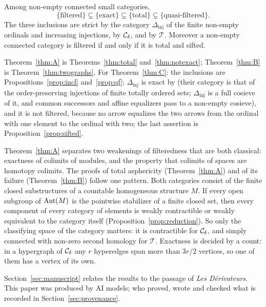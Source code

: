 \begin{theorem}\label{thm:C}
Among non-empty connected small categories,
\[
 \{\text{filtered}\}\subsetneq\{\text{exact}\}\subsetneq\{\text{total}\}
 \subsetneq\{\text{quasi-filtered}\}.
\]
The three inclusions are strict by the category $\Delta_{\mathrm{inj}}$ of
the finite non-empty ordinals and increasing injections, by $\mathcal{C}_{\delta}$, and by
$\mathcal T$. Moreover a non-empty connected category is filtered if and
only if it is total and sifted.
\end{theorem}

Theorem~\ref{thm:A} is Theorems~\ref{thm:total} and~\ref{thm:notexact};
Theorem~\ref{thm:B} is Theorem~\ref{thm:twographs}. For
Theorem~\ref{thm:C}: the inclusions are Propositions~\ref{prop:incl}
and~\ref{prop:qf}; $\Delta_{\mathrm{inj}}$ is exact by
\cite[Theorems~1 and~3]{IM73} (their category is that of the order-preserving
injections of finite totally ordered sets; $\Delta_{\mathrm{inj}}$ is a full
cosieve of it, and common successors and affine equalizers pass to a
non-empty cosieve), and it is not filtered, because no arrow
equalizes the two arrows from the ordinal with one element to the ordinal
with two; the last assertion is Proposition~\ref{prop:sifted}.

Theorem~\ref{thm:A} separates two weakenings of filteredness that are both
classical: exactness of colimits of modules, and the property that colimits of
spaces are homotopy colimits. The proofs of total asphericity
(Theorem~\ref{thm:A}) and of its failure (Theorem~\ref{thm:B}) follow one
pattern. Both categories consist of the finite closed substructures of a
countable homogeneous structure $M$. If every open subgroup of $\operatorname{Aut}(M)$ is
the pointwise stabilizer of a finite closed set, then every component of
every category of elements is weakly contractible or weakly equivalent to
the category itself (Proposition~\ref{prop:reduction}). So only the
classifying space of the category matters: it is contractible for $\mathcal{C}_{\delta}$, and
simply connected with non-zero second homology for $\mathcal T$. Exactness is
decided by a count: in a hypergraph of $\mathcal{C}_{\delta}$ any $r$ hyperedges span more
than $3r/2$ vertices, so one of them has a vertex of its own.

Section~\ref{sec:manuscript} relates the results to the passage of
\emph{Les D\'erivateurs}. This paper was produced by AI models; who proved,
wrote and checked what is recorded in Section~\ref{sec:provenance}.

